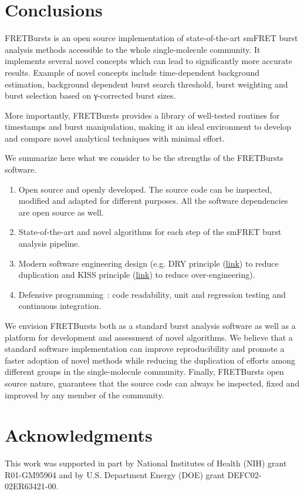 \section{Conclusions}
\label{sec:conclusions}

FRETBursts is an open source implementation of state-of-the-art smFRET burst analysis methods
accessible to the whole single-molecule community.
It implements several novel concepts which can lead
to significantly more accurate results. Example of novel concepts include
time-dependent background estimation, background dependent burst search threshold,
burst weighting and burst selection based on γ-corrected burst sizes.

More importantly, FRETBursts provides a library of well-tested routines
for timestamps and burst manipulation, making it an ideal environment to
develop and compare novel analytical techniques with minimal effort.

We summarize here what we consider to be the strengths
of the FRETBursts software.

\begin{enumerate}
\item Open source and openly developed. The source code can be inspected, modified and
adapted for different purposes. All the software dependencies are open source as well.
\item State-of-the-art and novel algorithms for each step of the
smFRET burst analysis pipeline.
\item Modern software engineering design (e.g. DRY principle
(\href{http://en.wikipedia.org/wiki/Don\%27t_repeat_yourself}{link})
to reduce duplication and KISS principle
(\href{http://en.wikipedia.org/wiki/KISS_principle}{link})
to reduce over-engineering).
\item Defensive programming~\cite{Prli__2012}: code readability,
unit and regression testing and continuous integration.
\end{enumerate}

We envision FRETBursts both as a standard burst analysis
software as well as a platform for development and assessment of novel algorithms.
We believe that a standard software implementation can improve
reproducibility and promote a faster adoption of novel methods 
while reducing the duplication of efforts among different groups
in the single-molecule community.
Finally, FRETBursts open source nature, guarantees that the source code
can always be inspected, fixed and improved
by any member of the community.


\section*{Acknowledgments}
This work was supported in part by National Institutes of Health (NIH)
grant R01-GM95904 and by U.S. Department Energy (DOE) grant DEFC02-02ER63421-00.

